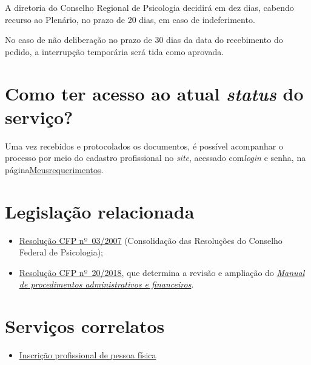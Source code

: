 A diretoria do Conselho Regional de Psicologia decidirá em dez dias, cabendo recurso ao Plenário, no prazo de 20 dias, em caso de indeferimento.

No caso de não deliberação no prazo de 30 dias da data do recebimento do pedido, a interrupção temporária será tida como aprovada.

\section{Como ter acesso ao atual \emph{status} do serviço?}

Uma vez recebidos e protocolados os documentos, é possível acompanhar o processo por meio do cadastro profissional no \emph{site}, acessado com\emph{login} e senha, na página\href{https://cfpsp.brctotal.com/crp06_servicosonline/pgsRequerimento/Requerimentos.aspx}{Meusrequerimentos}.

\section{Legislação relacionada}

\begin{itemize}
  \item  \href{https://atosoficiais.com.br/cfp/resolucao-administrativa-financeira-n-3-2007-institui-a-consolidacao-das-resolucoes-do-conselho-federal-de-psicologia?origin=instituicao&q=resolu\%C3\%A7\%C3\%A3o\%203/2007}{Resolução  CFP nº~03/2007} (Consolidação das Resoluções do Conselho Federal de  Psicologia);
  \item  \href{https://transparencia.cfp.org.br/wp-content/uploads/sites/7/2020/05/Manual-de-Procedimentos-Administrativos-e-Financeiro-CFP-RES-20.2018.pdf}{\href{https://atosoficiais.com.br/cfp/resolucao-administrativa-financeira-n-20-2018-altera-o-manual-de-procedimentos-administrativo-e-financeiro-do-sistema-conselhos-de-psicologia-anexo-da-resolucao-cfp-n-202018-a-resolucao-cfp-n-03-2007-a-resolucao-cfp-n-16-2019-e-da-outras-providencias}{Resolução  CFP nº~20/2018}}, que determina a revisão e ampliação do  \href{https://transparencia.cfp.org.br/wp-content/uploads/sites/7/2020/05/Manual-de-Procedimentos-Administrativos-e-Financeiro-CFP-RES-20.2018.pdf}{\emph{Manual  de procedimentos administrativos e financeiros}}.
\end{itemize}

\section{Serviços correlatos}

\begin{itemize}
  \item  \hyperref[chap:pf-inscricao]{Inscrição  profissional de pessoa física}
\end{itemize}

\sumario
